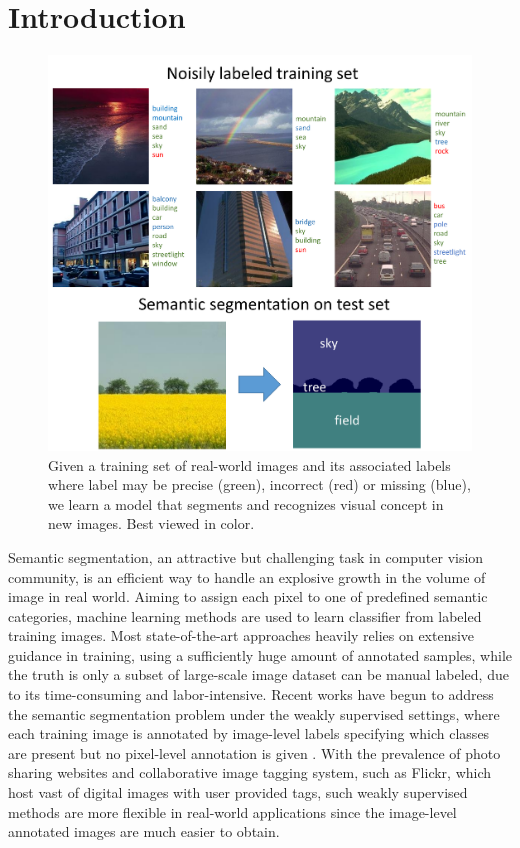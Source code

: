 \section{Introduction}

\begin{figure}[t]
\begin{center}
    \includegraphics[width=1\linewidth]{noisyparsing.pdf}
\end{center}
    \caption{Given a training set of real-world images and its associated labels where label may be precise (green), incorrect (red) or missing (blue), we learn a model that segments and recognizes visual concept in new images. Best viewed in color.}
\label{fig:noisyparsing}
\end{figure}

Semantic segmentation, an attractive but challenging task in computer vision community, is an efficient way to handle an explosive growth in the volume of image in real world. Aiming to assign each pixel to one of predefined semantic categories, machine learning methods are used to learn classifier from labeled training images. Most state-of-the-art approaches heavily relies on extensive guidance in training, using a sufficiently huge amount of annotated samples, while the truth is only a subset of large-scale image dataset can be manual labeled, due to its time-consuming and labor-intensive. Recent works have begun to address the semantic segmentation problem under the weakly supervised settings, where each training image is annotated by image-level labels specifying which classes are present but no pixel-level annotation is given \cite{verbeek2007region,vezhnevets2010towards,vezhnevets2011weakly,vezhnevets2012weakly,xu2014tell,zhang2013sparse,zhang2013probabilistic}. With the prevalence of photo sharing websites and collaborative image tagging system, such as Flickr, which host vast of digital images with user provided tags, such weakly supervised methods are more flexible in real-world applications since the image-level annotated images are much easier to obtain.

